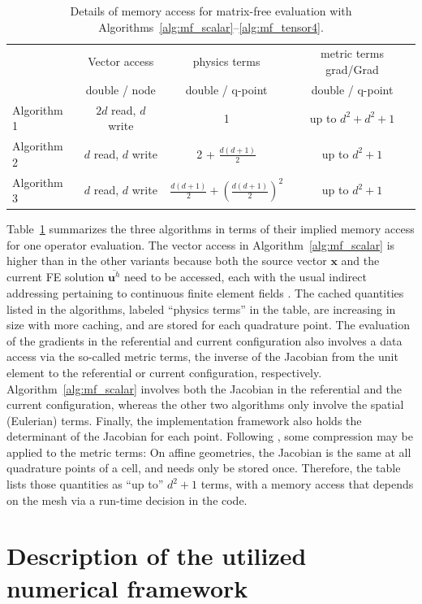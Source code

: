 \documentclass[AMA,STIX1COL]{WileyNJD-v2}
\newcommand*{\gz}[1]{\boldsymbol{#1}}
\begin{document}
\begin{table}
\centering
\caption{Details of memory access for matrix-free evaluation with Algorithms~\ref{alg:mf_scalar}--\ref{alg:mf_tensor4}.}
\label{tab:memory}
\begin{tabular}{|l|ccc|}
\hline
 & Vector access & physics terms & metric terms grad/Grad \\
 & double / node & double / q-point & double / q-point \\
 \hline
Algorithm 1 & $2d$ read, $d$ write & 1 & up to $d^2 + d^2 + 1$\\
Algorithm 2 & $d$ read, $d$ write & 2 + $\frac{d(d+1)}{2}$ & up to $d^2+1$\\
Algorithm 3 & $d$ read, $d$ write & $\frac{d(d+1)}{2}+\left(\frac{d(d+1)}{2}\right)^2$ & up to $d^2+1$\\
\hline
\end{tabular}
\end{table}

Table~\ref{tab:memory} summarizes the three algorithms in terms of their implied
memory access for one operator evaluation. The vector access in
Algorithm~\ref{alg:mf_scalar} is higher than in the other variants because both
the source vector $\gz x$ and the current FE
solution $\overline{\gz u^h}$ need to be accessed, each with the usual indirect
addressing pertaining to continuous finite element fields \cite{kronbichler12}.
The cached quantities listed in the algorithms, labeled ``physics terms'' in the
table, are increasing in size with more caching, and are stored for each
quadrature point. The evaluation of the gradients in the referential
and current configuration also involves a data access via the so-called metric
terms, the inverse of the Jacobian from the unit element to the referential or
current configuration, respectively. Algorithm~\ref{alg:mf_scalar} involves
both the Jacobian in the referential and the current configuration, whereas the other
two algorithms only involve the spatial (Eulerian) terms. Finally, the
implementation framework also holds the determinant of the Jacobian for each
point. Following \cite{kronbichler12}, some compression may be applied to the
metric terms: On affine geometries, the Jacobian is the same at all quadrature
points of a cell, and needs only be stored once. Therefore, the table lists
those quantities as ``up to'' $d^2+1$ terms, with a memory access that depends
on the mesh via a run-time decision in the code.

\section{Description of the utilized numerical framework}
\label{sec:framework}
\end{document}
